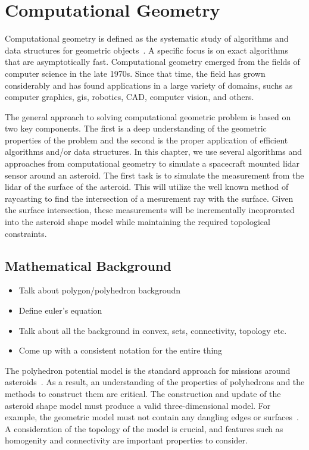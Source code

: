 
\chapter{Computational Geometry}

Computational geometry is defined as the systematic study of algorithms and data structures for geometric objects~\cite{berg2008}.
A specific focus is on exact algorithms that are asymptotically fast.
Computational geometry emerged from the fields of computer science in the late 1970s.
Since that time, the field has grown considerably and has found applications in a large variety of domains, suchs as computer graphics, \gls{gis}, robotics, \gls{CAD}, computer vision, and others.

The general approach to solving computational geometric problem is based on two key components.
The first is a deep understanding of the geometric properties of the problem and the second is the proper application of efficient algorithms and/or data structures.
In this chapter, we use several algorithms and approaches from computational geometry to simulate a spacecraft mounted \gls{lidar} sensor around an asteroid.
The first task is to simulate the measurement from the \gls{lidar} of the surface of the asteroid.
This will utilize the well known method of \gls{raycasting} to find the intersection of a mesurement ray with the surface.
Given the surface intersection, these measurements will be incrementally incoprorated into the asteroid shape model while maintaining the required topological constraints.

\section{Mathematical Background}

\begin{itemize}
    \item Talk about polygon/polyhedron backgroudn
    \item Define euler's equation
    \item Talk about all the background in convex, sets, connectivity, topology etc.
    \item Come up with a consistent notation for the entire thing
\end{itemize}

The \gls{polyhedron} potential model is the standard approach for missions around asteroids~\cite{werner1996,werner1994}.
As a result, an understanding of the properties of \glspl{polyhedron} and the methods to construct them are critical.
The construction and update of the asteroid shape model must produce a valid three-dimensional model.
For example, the geometric model must not contain any dangling edges or surfaces~\cite{mortenson1997}.
A consideration of the topology of the model is crucial, and features such as homogenity and connectivity are important properties to consider.

